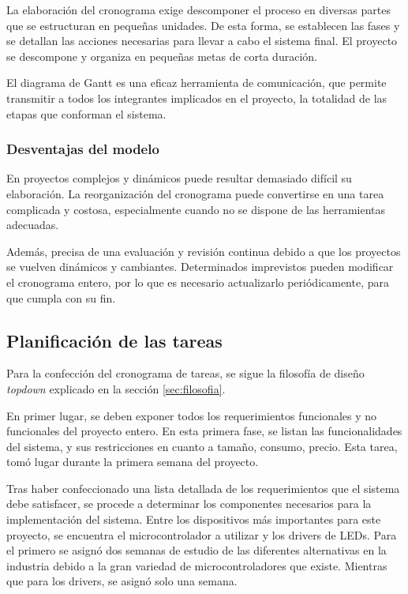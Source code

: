La elaboración del cronograma exige descomponer el proceso en diversas partes que se estructuran en pequeñas unidades. De esta forma, se establecen las fases y se detallan las acciones necesarias para llevar a cabo el sistema final. El proyecto se descompone y organiza en pequeñas metas de corta duración.

El diagrama de Gantt es una eficaz herramienta de comunicación, que permite transmitir a todos los integrantes implicados en el proyecto, la totalidad de las etapas que conforman el sistema.

\subsubsection{Desventajas del modelo}
En proyectos complejos y dinámicos puede resultar demasiado difícil su elaboración. La reorganización del cronograma puede convertirse en una tarea complicada y costosa, especialmente cuando no se dispone de las herramientas adecuadas.

Además, precisa de una evaluación y revisión continua debido a que los proyectos se vuelven dinámicos y cambiantes. Determinados imprevistos pueden modificar el cronograma entero, por lo que es necesario actualizarlo periódicamente, para que cumpla con su fin.

\subsection{Planificación de las tareas}

Para la confección del cronograma de tareas, se sigue la filosofía de diseño \emph{topdown} explicado en la sección \ref{sec:filosofia}.

En primer lugar, se deben exponer todos los requerimientos funcionales y no funcionales del proyecto entero.
En esta primera fase, se listan las funcionalidades del sistema, y sus restricciones en cuanto a tamaño, consumo, precio.
Esta tarea, tomó lugar durante la primera semana del proyecto.

Tras haber confeccionado una lista detallada de los requerimientos que el sistema debe satisfacer, se procede a determinar los componentes necesarios para la implementación del sistema.
Entre los dispositivos más importantes para este proyecto, se encuentra el microcontrolador a utilizar y los drivers de LEDs.
Para el primero se asignó dos semanas de estudio de las diferentes alternativas en la industria debido a la gran variedad de microcontroladores que existe. Mientras que para los drivers, se asignó solo una semana.


